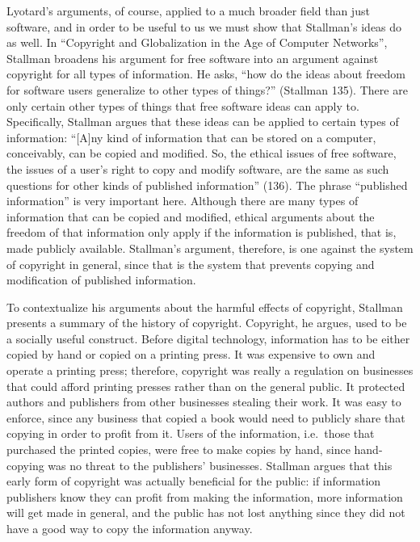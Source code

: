 \documentclass[titlepage]{article}
\begin{document}
Lyotard's arguments, of course, applied to a much broader field than
just software, and in order to be useful to us we must show that
Stallman's ideas do as well. In ``Copyright and Globalization in the Age
of Computer Networks'', Stallman broadens his argument for free software
into an argument against copyright for all types of information. He
asks, ``how do the ideas about freedom for software users generalize to
other types of things?'' (Stallman 135). There are only certain other
types of things that free software ideas can apply to. Specifically,
Stallman argues that these ideas can be applied to certain types of
information: ``{[}A{]}ny kind of information that can be stored on a
computer, conceivably, can be copied and modified. So, the ethical
issues of free software, the issues of a user's right to copy and modify
software, are the same as such questions for other kinds of published
information'' (136). The phrase ``published information'' is very
important here. Although there are many types of information that can be
copied and modified, ethical arguments about the freedom of that
information only apply if the information is published, that is, made
publicly available. Stallman's argument, therefore, is one against the
system of copyright in general, since that is the system that prevents
copying and modification of published information.

To contextualize his arguments about the harmful effects of copyright,
Stallman presents a summary of the history of copyright. Copyright, he
argues, used to be a socially useful construct. Before digital
technology, information has to be either copied by hand or copied on a
printing press. It was expensive to own and operate a printing press;
therefore, copyright was really a regulation on businesses that could
afford printing presses rather than on the general public. It protected
authors and publishers from other businesses stealing their work. It was
easy to enforce, since any business that copied a book would need to
publicly share that copying in order to profit from it. Users of the
information, i.e.~those that purchased the printed copies, were free to
make copies by hand, since hand-copying was no threat to the publishers'
businesses. Stallman argues that this early form of copyright was
actually beneficial for the public: if information publishers know they
can profit from making the information, more information will get made
in general, and the public has not lost anything since they did not have
a good way to copy the information anyway.
\end{document}

